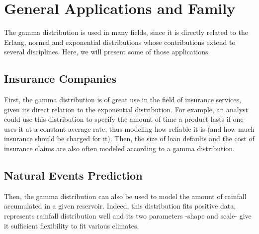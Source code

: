 \documentclass[12pt]{article}
\begin{document}

\pagebreak
\section{General Applications and Family}\label{section:generalApplications}

The gamma distribution is used in many fields, since it is directly related to the Erlang, normal and exponential
distributions whose contributions extend to several disciplines. Here, we will present some of those applications.

\subsection{Insurance Companies}
First, the gamma distribution is of great use in the field of insurance services, given its direct relation to the
exponential distribution. For example, an analyst could use this distribution to specify the amount of time a product
lasts if one uses it at a constant average rate, thus modeling how reliable it is (and how much insurance should be
charged for it). Then, the size of loan defaults and the cost of insurance claims are also often modeled according to a
gamma distribution.

\subsection{Natural Events Prediction}
Then, the gamma distribution can also be used to model the amount of rainfall accumulated in a given reservoir. Indeed,
this distribution fits positive data, represents rainfall distribution well and its two parameters -shape and scale-
give it sufficient flexibility to fit various climates\cite{husakUseGammaDistribution2007a}.
\end{document}
